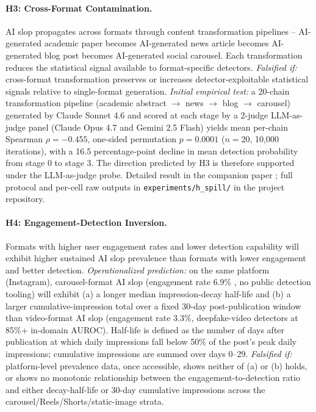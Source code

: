 \documentclass[12pt]{article}
\begin{document}
\paragraph{H3: Cross-Format Contamination.} AI slop propagates across formats through content transformation pipelines -- AI-generated academic paper becomes AI-generated news article becomes AI-generated blog post becomes AI-generated social carousel. Each transformation reduces the statistical signal available to format-specific detectors. \textit{Falsified if:} cross-format transformation preserves or increases detector-exploitable statistical signals relative to single-format generation. \textit{Initial empirical test:} a 20-chain transformation pipeline (academic abstract $\to$ news $\to$ blog $\to$ carousel) generated by Claude Sonnet 4.6 and scored at each stage by a 2-judge LLM-as-judge panel (Claude Opus 4.7 and Gemini 2.5 Flash) yields mean per-chain Spearman $\rho = -0.455$, one-sided permutation $p = 0.0001$ ($n=20$, 10{,}000 iterations), with a 16.5 percentage-point decline in mean detection probability from stage 0 to stage 3. The direction predicted by H3 is therefore supported under the LLM-as-judge probe. Detailed result in the companion paper \cite{author2026amsm}; full protocol and per-cell raw outputs in \texttt{experiments/h\_spill/} in the project repository.

\paragraph{H4: Engagement-Detection Inversion.} Formats with higher user engagement rates and lower detection capability will exhibit higher sustained AI slop prevalence than formats with lower engagement and better detection. \textit{Operationalized prediction:} on the same platform (Instagram), carousel-format AI slop (engagement rate 6.9\% \cite{buffer2026}, no public detection tooling) will exhibit (a) a longer median impression-decay half-life and (b) a larger cumulative-impression total over a fixed 30-day post-publication window than video-format AI slop (engagement rate 3.3\%, deepfake-video detectors at 85\%+ in-domain AUROC). Half-life is defined as the number of days after publication at which daily impressions fall below 50\% of the post's peak daily impressions; cumulative impressions are summed over days 0--29. \textit{Falsified if:} platform-level prevalence data, once accessible, shows neither of (a) or (b) holds, or shows no monotonic relationship between the engagement-to-detection ratio and either decay-half-life or 30-day cumulative impressions across the carousel/Reels/Shorts/static-image strata.
\end{document}
